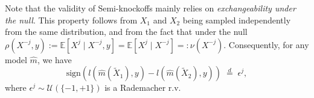 \documentclass{article}
\theoremstyle{plain}
\theoremstyle{definition}
\theoremstyle{remark}
\newcommand{\e}[1]{\mathbb{E}\left[#1\right]  } %
\begin{document}
 
Note that the validity of Semi-knockoffs mainly relies on \emph{exchangeability under the null}. This property follows from $X_1$ and $X_2$ being sampled independently from the same distribution, and from the fact that under the null
$\rho(X^{-j}, y) := \mathbb{E}[X^j \mid X^{-j}, y] = \mathbb{E}[X^j \mid X^{-j}] =: \nu(X^{-j}).$ Consequently, for any model $\widehat{m}$, we have
%
\[
\mathrm{sign}\left(l(\widehat{m}(\widetilde{X}_1), y) - l(\widehat{m}(\widetilde{X}_2), y)\right) \;\overset{d}{=}\; \epsilon^j,
\]
%
where $\epsilon^j \sim \mathcal{U}(\{-1, +1\})$ is a Rademacher r.v.  
\end{document}

